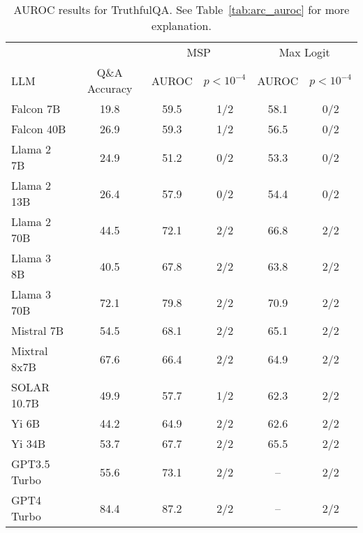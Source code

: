 \begin{table*}[h]
\centering
\caption{AUROC results for TruthfulQA. See Table~\ref{tab:arc_auroc} for more explanation.}
\label{tab:truthfulqa_auroc}
\begin{tabular}{lccccc}
\toprule
& & \multicolumn{2}{c}{MSP} & \multicolumn{2}{c}{Max Logit} \\ 
LLM & Q\&A Accuracy & AUROC & $p < 10^{-4}$ & AUROC & $p < 10^{-4}$ \\ 
\cmidrule(lr){1-1} \cmidrule(lr){2-2} \cmidrule(lr){3-4} \cmidrule(lr){5-6} 
Falcon 7B & 19.8 & 59.5 & 1/2 & 58.1 & 0/2\\
Falcon 40B & 26.9 & 59.3 & 1/2 & 56.5 & 0/2\\
Llama 2 7B & 24.9 & 51.2 & 0/2 & 53.3 & 0/2\\
Llama 2 13B & 26.4 & 57.9 & 0/2 & 54.4 & 0/2\\
Llama 2 70B & 44.5 & 72.1 & 2/2 & 66.8 & 2/2\\
Llama 3 8B & 40.5 & 67.8 & 2/2 & 63.8 & 2/2\\
Llama 3 70B & 72.1 & 79.8 & 2/2 & 70.9 & 2/2\\
Mistral 7B & 54.5 & 68.1 & 2/2 & 65.1 & 2/2\\
Mixtral 8x7B & 67.6 & 66.4 & 2/2 & 64.9 & 2/2\\
SOLAR 10.7B & 49.9 & 57.7 & 1/2 & 62.3 & 2/2\\
Yi 6B & 44.2 & 64.9 & 2/2 & 62.6 & 2/2\\
Yi 34B & 53.7 & 67.7 & 2/2 & 65.5 & 2/2\\
GPT3.5 Turbo & 55.6 & 73.1 & 2/2 & -- & 2/2\\
GPT4 Turbo & 84.4 & 87.2 & 2/2 & -- & 2/2\\
\bottomrule
\end{tabular}
\end{table*}
